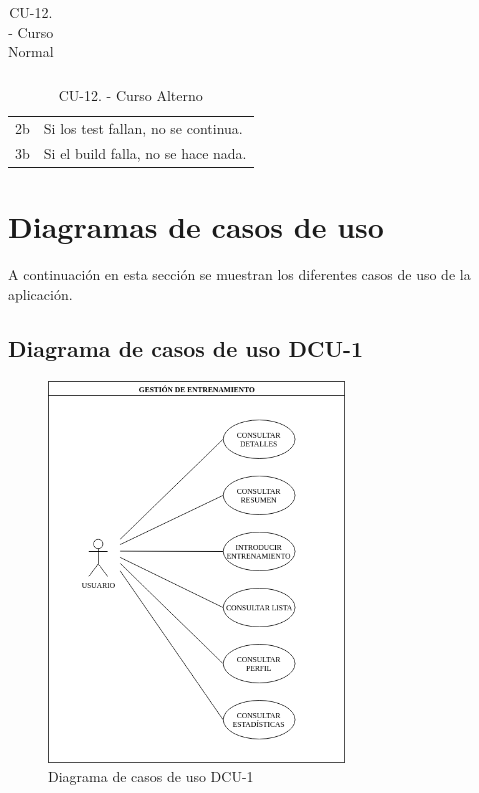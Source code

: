 \begin{itemize}
\begin{table}[H]
\begin{tabularx}{\textwidth}{|l|X|l|X|}
                                
    \end{tabularx}
    \caption{CU-12. - Curso Normal}
    \label{my-label}
  \end{table}
  \begin{table}[H]
    \centering
    \begin{tabularx}{\textwidth}{|l|X|}
     \hline
     \rowcolor[HTML]{C0C0C0} 
     \multicolumn{2}{|l|}{\cellcolor[HTML]{C0C0C0}Curso Alterno} \\ \hline
     \rowcolor[HTML]{FFFFFF} 
            2b                      & Si los test fallan, no se continua.                           \\ \hline
            3b                      & Si el build falla, no se hace nada.                           \\ \hline
    \end{tabularx}
    \caption{CU-12. - Curso Alterno}
    \label{my-label}
  \end{table}
\end{itemize}


\section {Diagramas de casos de uso}
A continuación en esta sección se muestran los diferentes casos de uso de la aplicación.

\subsection{Diagrama de casos de uso DCU-1 }
\begin{figure}[H]
  \begin{center}
    \includegraphics[width=0.7\textwidth]{imagenes/DCU-1.png}
    \caption{Diagrama de casos de uso DCU-1}
    \label{fig:DCU-1}
  \end{center}
\end{figure}
